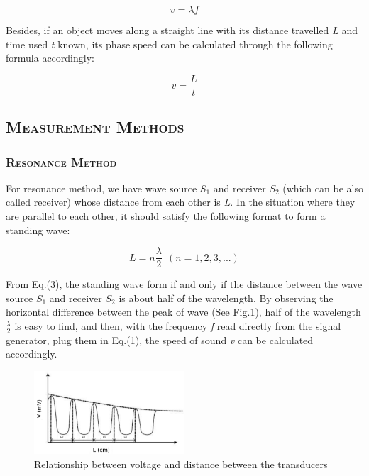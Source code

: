 \documentclass[a4paper,12pt]{article}
\begin{document}
\begin{equation} \label{eq1}
\textit{$v=\lambda f$} 
\end{equation}

Besides, if an object moves along a straight line with its distance travelled \textit{L} and time used \textit{t} known, its phase speed can be calculated through the following formula accordingly:

\begin{equation} \label{eq2}
\textit{$v = \frac{L}{t} $}
\end{equation}

\subsection{\textsc{Measurement Methods}}
\subsubsection{\textsc{Resonance Method}}
For resonance method, we have wave source \textit{$S_1$} and receiver \textit{$S_2$} (which can be also called receiver) whose distance from each other is \textit{L}. In the situation where they are parallel to each other, it should satisfy the following format to form a standing wave:

\begin{equation}
\textit{$L=n\frac{\lambda}{2}~~(n = 1,2,3,...)$}
\end{equation}

From Eq.(3), the standing wave form if and only if the distance between the wave source \textit{$S_1$} and receiver \textit{$S_2$} is about half of the wavelength. By observing the horizontal difference between the peak of wave (See Fig.1), half of the wavelength \textit{$\frac{\lambda}{2}$} is easy to find, and then, with the frequency \textit{f} read directly from the signal generator, plug them in Eq.(1), the speed of sound \textit{v} can be calculated accordingly. 

\begin{figure}[h] 
    \centering
    \includegraphics[width=0.5\textwidth]{Fig1} 
    \caption{Relationship between voltage and distance between the transducers \cite{labmanual}} 
\end{figure}
\end{document}
